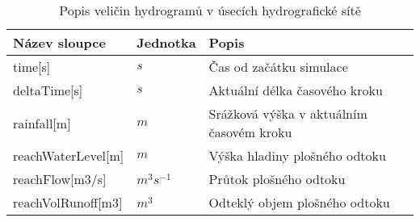 


\begin{table}[t]
 

 \centering
 \caption{Popis veličin  hydrogramů v úsecích hydrografické sítě}
\label{tab:vystupytokdat}

 \begin{tabular}{llp{}}
  \hline  \hline
 Název sloupce        & Jednotka     & Popis                                      \\ 
 \hline
 time[s]              &   $s$              &  Čas od začátku simulace                   \\
 deltaTime[s]         &   $s$              &  Aktuální délka časového kroku            \\
 rainfall[m]          &  $m$               &  Srážková výška v aktuálním časovém kroku \\
 reachWaterLevel[m]        &  $m$          &  Výška hladiny plošného odtoku            \\
 reachFlow[m3/s]              &  $m^3s^{-1}$   &  Průtok plošného odtoku                   \\
 reachVolRunoff[m3]           &  $m^3$         & Odteklý objem plošného odtoku     \\
  \hline  \hline
 \end{tabular}

\end{table}

% 
% 
